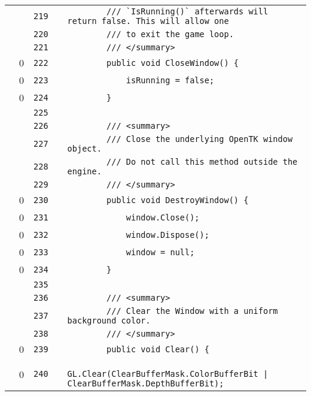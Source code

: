 \documentclass[a4paper,landscape,10pt]{article}
\begin{document}
\begin{longtable}[l]{lrrll}
\cellcolor{gray} &  & \verb~219~ & & \verb~        /// `IsRunning()` afterwards will return false. This will allow one~\\
\cellcolor{gray} &  & \verb~220~ & & \verb~        /// to exit the game loop.~\\
\cellcolor{gray} &  & \verb~221~ & & \verb~        /// </summary>~\\
\cellcolor{red} & 0 & \verb~222~ & & \verb~        public void CloseWindow() {~\\
\cellcolor{red} & 0 & \verb~223~ & & \verb~            isRunning = false;~\\
\cellcolor{red} & 0 & \verb~224~ & & \verb~        }~\\
\cellcolor{gray} &  & \verb~225~ & & \verb~~\\
\cellcolor{gray} &  & \verb~226~ & & \verb~        /// <summary>~\\
\cellcolor{gray} &  & \verb~227~ & & \verb~        /// Close the underlying OpenTK window object.~\\
\cellcolor{gray} &  & \verb~228~ & & \verb~        /// Do not call this method outside the engine.~\\
\cellcolor{gray} &  & \verb~229~ & & \verb~        /// </summary>~\\
\cellcolor{red} & 0 & \verb~230~ & & \verb~        public void DestroyWindow() {~\\
\cellcolor{red} & 0 & \verb~231~ & & \verb~            window.Close();~\\
\cellcolor{red} & 0 & \verb~232~ & & \verb~            window.Dispose();~\\
\cellcolor{red} & 0 & \verb~233~ & & \verb~            window = null;~\\
\cellcolor{red} & 0 & \verb~234~ & & \verb~        }~\\
\cellcolor{gray} &  & \verb~235~ & & \verb~~\\
\cellcolor{gray} &  & \verb~236~ & & \verb~        /// <summary>~\\
\cellcolor{gray} &  & \verb~237~ & & \verb~        /// Clear the Window with a uniform background color.~\\
\cellcolor{gray} &  & \verb~238~ & & \verb~        /// </summary>~\\
\cellcolor{red} & 0 & \verb~239~ & & \verb~        public void Clear() {~\\
\cellcolor{red} & 0 & \verb~240~ & & \verb~            GL.Clear(ClearBufferMask.ColorBufferBit | ClearBufferMask.DepthBufferBit);~\\

\end{longtable}
\end{document}
